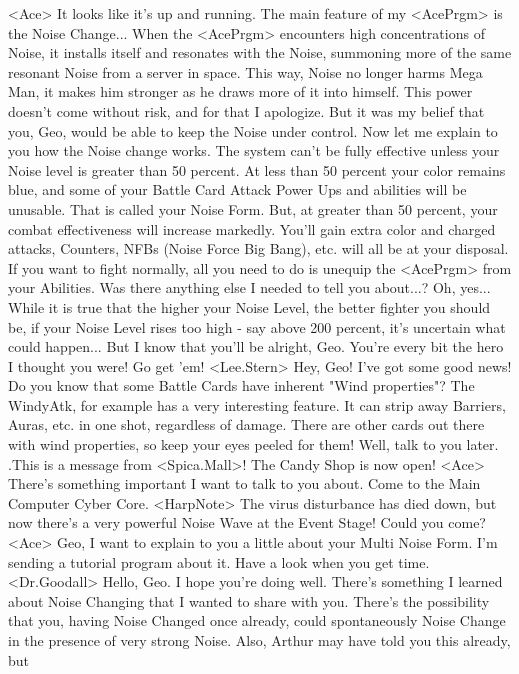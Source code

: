 <Ace> It looks like it's up and running. 
The main feature of my <AcePrgm> is the Noise Change... When the 
<AcePrgm> encounters high concentrations of Noise, it installs itself and 
resonates with the Noise, summoning more of the same resonant Noise from 
a server in space. This way, Noise no longer 
harms Mega Man, it makes him stronger as he draws more of it into 
himself. This power doesn't come without risk, and for that I 
apologize. But it was my belief that you, Geo, 
would be able to keep the Noise under control. 
Now let me explain to you how the Noise change works. 
The system can't be fully effective unless your 
Noise level is greater than 50 percent. 
At less than 50 percent your color remains blue, 
and some of your Battle Card Attack Power Ups and abilities will be unusable. 
That is called your Noise Form. 
But, at greater than 50 percent, your combat effectiveness 
will increase markedly. You'll gain extra color and charged attacks, 
Counters, NFBs (Noise Force Big Bang), etc. will 
all be at your disposal. If you want to fight 
normally, all you need to do is unequip the <AcePrgm> from your Abilities. 
Was there anything else I needed to tell you 
about...? Oh, yes... While it is true that the 
higher your Noise Level, the better fighter you should be, if your Noise 
Level rises too high - say above 200 percent, 
it's uncertain what could happen... 
But I know that you'll be alright, Geo. 
You're every bit the hero I thought you were! Go get 'em! 
<Lee.Stern> Hey, Geo! I've got some good news! 
Do you know that some Battle Cards have 
inherent "Wind properties"? 
The WindyAtk, for example has a very interesting feature. 
It can strip away Barriers, Auras, etc. in one shot, regardless of damage. 
There are other cards out there with wind 
properties, so keep your eyes peeled for them! 
Well, talk to you later. 
.This is a message from <Spica.Mall>! The Candy Shop is now open! 
<Ace> There's something important I want to talk to you about. 
Come to the Main Computer Cyber Core. 
<HarpNote> The virus disturbance has died down, 
but now there's a very powerful Noise Wave at the Event Stage! 
Could you come? 
<Ace> Geo, I want to explain to you a little about your Multi Noise Form. 
I'm sending a tutorial program about it. Have a look when you get time. 
<Dr.Goodall> Hello, Geo. 
I hope you're doing well. 
There's something I learned about Noise Changing that I wanted to 
share with you. There's the possibility 
that you, having Noise Changed once already, 
could spontaneously Noise Change in the 
presence of very strong Noise. 
Also, Arthur may have told you this already, but 
